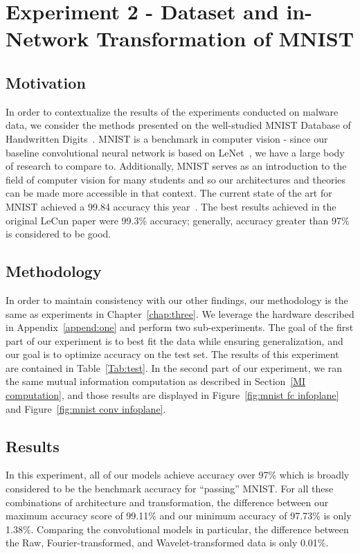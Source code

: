 \chapter{Experiment 2 - Dataset and in-Network Transformation of MNIST}
\label{chap:five}

\section{Motivation}
In order to contextualize the results of the experiments conducted on malware data, we consider the methods presented on the well-studied MNIST Database of Handwritten Digits~\cite{lecun1998mnist}.
MNIST is a benchmark in computer vision - since our baseline convolutional neural network is based on LeNet~\cite{lecun1998gradient}, we have a large body of research to compare to.
Additionally, MNIST serves as an introduction to the field of computer vision for many students and so our architectures and theories can be made more accessible in that context.
The current state of the art for MNIST achieved a 99.84 accuracy this year~\cite{byerly2020branching}.
The best results achieved in the original LeCun paper were 99.3\% accuracy; generally, accuracy greater than 97\% is considered to be good.

\section{Methodology}
In order to maintain consistency with our other findings, our methodology is the same as experiments in Chapter~\ref{chap:three}.
We leverage the hardware described in Appendix~\ref{append:one} and perform two sub-experiments.
The goal of the first part of our experiment is to best fit the data while ensuring generalization, and our goal is to optimize accuracy on the test set.
The results of this experiment are contained in Table~\ref{Tab:test}.
In the second part of our experiment, we ran the same mutual information computation as described in Section~\ref{MI computation}, and those results are displayed in Figure~\ref{fig:mnist fc infoplane} and Figure~\ref{fig:mnist conv infoplane}.

\section{Results}
In this experiment, all of our models achieve accuracy over 97\% which is broadly considered to be the benchmark accuracy for ``passing'' MNIST. 
For all these combinations of architecture and transformation, the difference between our maximum accuracy score of 99.11\% and our minimum accuracy of 97.73\% is only 1.38\%.
Comparing the convolutional models in particular, the difference between the Raw, Fourier-transformed, and Wavelet-transformed data is only 0.01\%. 

